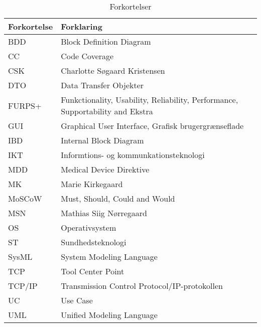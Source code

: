 \begin{table}[htb]
\begin{tabular}{ | m{6em} | m{30em} | } \hline

\textbf{Forkortelse} & \textbf{Forklaring} \\ \hline
BDD & Block Definition Diagram \\\hline
CC & Code Coverage \\\hline
CSK & Charlotte Søgaard Kristensen \\ \hline 
DTO & Data Transfer Objekter \\\hline
FURPS+ & Funkctionality, Usability, Reliability, Performance, Supportability and Ekstra \\\hline
GUI & Graphical User Interface, Grafisk brugergrænseflade \\ \hline 
IBD & Internal Block Diagram \\\hline
IKT & Informtions- og kommunkationsteknologi\\\hline
MDD & Medical Device Direktive \\\hline
MK &  Marie Kirkegaard \\ \hline
MoSCoW & Must, Should, Could and Would \\\hline
MSN & Mathias Siig Nørregaard \\ \hline 
OS & Operativsystem \\\hline
ST & Sundhedsteknologi \\\hline
SysML &  System Modeling Language \\\hline
TCP & Tool Center Point \\\hline
TCP/IP & Transmission Control Protocol/IP-protokollen \\\hline
UC & Use Case \\\hline
UML & Unified Modeling Language\\\hline
\end{tabular}
\caption{Forkortelser}
\end{table}
\newpage


